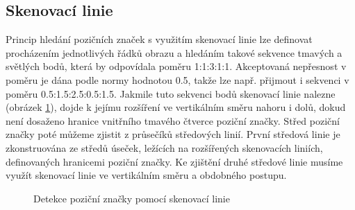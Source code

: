 \subsection{Skenovací linie}
\label{skenovaciLinie}

Princip hledání pozičních značek s využitím skenovací linie lze definovat
procházením jednotlivých řádků obrazu a hledáním takové sekvence tmavých a
světlých bodů, která by odpovídala poměru 1:1:3:1:1. Akceptovaná nepřesnost v
poměru je dána podle normy hodnotou 0.5, takže lze např. přijmout i sekvenci v
poměru 0.5:1.5:2.5:0.5:1.5. Jakmile tuto sekvenci bodů skenovací linie nalezne
(obrázek \ref{QRCodeDetectionWithScanline}), dojde k jejímu rozšíření ve
vertikálním směru nahoru i dolů, dokud není dosaženo hranice vnitřního tmavého čtverce poziční značky. Střed poziční
značky poté můžeme zjistit z průsečíků středových linií. První středová linie je
zkonstruována ze středů úseček, ležících na rozšířených skenovacích liniích,
definovaných hranicemi poziční značky. Ke zjištění druhé středové linie musíme
využít skenovací linie ve vertikálním směru a obdobného postupu.

\begin{figure}[H]
  \begin{center}
    \caption{Detekce poziční značky pomocí skenovací linie}
    \label{QRCodeDetectionWithScanline}
  \end{center}
\end{figure}

